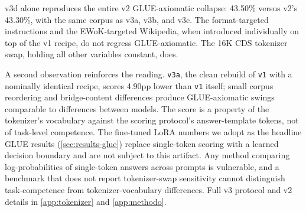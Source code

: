 \documentclass[11pt]{article}
\begin{document}
\begin{table}[t]
\centering
{}
\caption{Single-intervention ablation isolating which v2 component caused the 7.70pp GLUE-axiomatic collapse. Only v3d, the tokenizer swap, reproduces the v2 floor.}
\label{tab:v3-ablation}
\vspace{-1.5em}
\end{table}

\noindent v3d alone reproduces the entire v2 GLUE-axiomatic collapse: 43.50\% versus v2's 43.30\%, with the same corpus as v3a, v3b, and v3c. The format-targeted instructions and the EWoK-targeted Wikipedia, when introduced individually on top of the v1 recipe, do not regress GLUE-axiomatic. The 16K CDS tokenizer swap, holding all other variables constant, does.

A second observation reinforces the reading. \texttt{v3a}, the clean rebuild of \texttt{v1} with a nominally identical recipe, scores 4.90pp lower than \texttt{v1} itself; small corpus reordering and bridge-content differences produce GLUE-axiomatic swings comparable to differences between models. The score is a property of the tokenizer's vocabulary against the scoring protocol's answer-template tokens, not of task-level competence. The fine-tuned LoRA numbers we adopt as the headline GLUE results (\autoref{sec:results-glue}) replace single-token scoring with a learned decision boundary and are not subject to this artifact. Any method comparing log-probabilities of single-token answers across prompts is vulnerable, and a benchmark that does not report tokenizer-swap sensitivity cannot distinguish task-competence from tokenizer-vocabulary differences. Full v3 protocol and v2 details in \autoref{app:tokenizer} and \autoref{app:methodo}.
\end{document}

